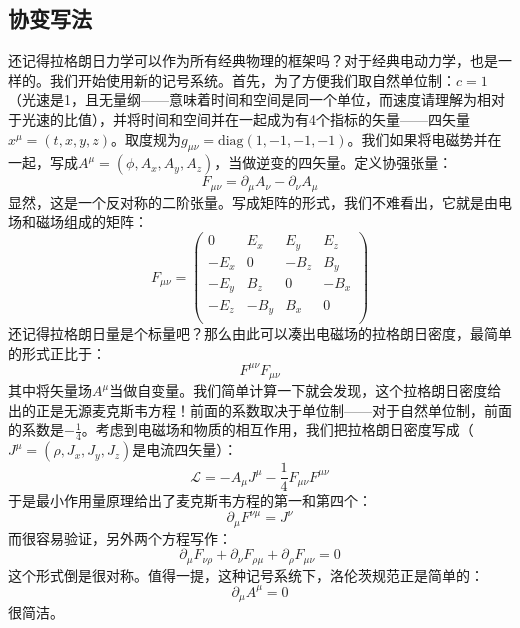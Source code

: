 \documentclass{ctexart}
\begin{document}
\subsection{协变写法}
还记得拉格朗日力学可以作为所有经典物理的框架吗？对于经典电动力学，也是一样的。我们开始使用新的记号系统。首先，为了方便我们取自然单位制：$c=1$（光速是1，且无量纲——意味着时间和空间是同一个单位，而速度请理解为相对于光速的比值），并将时间和空间并在一起成为有4个指标的矢量——四矢量$x^\mu=(t,x,y,z)$。取度规为$g_{\mu\nu}=\mathrm{diag}(1,-1,-1,-1)$。我们如果将电磁势并在一起，写成$A^\mu=(\phi,A_x,A_y,A_z)$，当做逆变的四矢量。定义协强张量：
\begin{equation}
F_{\mu\nu}=\partial_\mu A_\nu-\partial_\nu A_\mu
\end{equation}
显然，这是一个反对称的二阶张量。写成矩阵的形式，我们不难看出，它就是由电场和磁场组成的矩阵：
\begin{equation}
F_{\mu\nu}=\left(\begin{array}{cccc} 0 & E_x & E_y & E_z \\ -E_x & 0 & -B_z & B_y\\ -E_y & B_z & 0 & -B_x\\ -E_z & -B_y & B_x & 0\\ \end{array}\right)
\end{equation}
还记得拉格朗日量是个标量吧？那么由此可以凑出电磁场的拉格朗日密度，最简单的形式正比于：
\begin{equation}
F^{\mu\nu}F_{\mu\nu}
\end{equation}
其中将矢量场$A^\mu$当做自变量。我们简单计算一下就会发现，这个拉格朗日密度给出的正是无源麦克斯韦方程！前面的系数取决于单位制——对于自然单位制，前面的系数是$-\frac{1}{4}$。考虑到电磁场和物质的相互作用，我们把拉格朗日密度写成（$J^\mu=(\rho,J_x,J_y,J_z)$是电流四矢量）：
\begin{equation}
\mathcal{L}=-A_\mu J^\mu-\frac{1}{4}F_{\mu\nu}F^{\mu\nu}
\end{equation}
于是最小作用量原理给出了麦克斯韦方程的第一和第四个：
\begin{equation}
\partial_\mu F^{\nu\mu}=J^\nu
\end{equation}
而很容易验证，另外两个方程写作：
\begin{equation}
\partial_\mu F_{\nu\rho}+\partial_\nu F_{\rho\mu}+\partial_\rho F_{\mu\nu}=0
\end{equation}
这个形式倒是很对称。值得一提，这种记号系统下，洛伦茨规范正是简单的：
\begin{equation}
\partial_\mu A^\mu=0
\end{equation}
很简洁。
\end{document}
